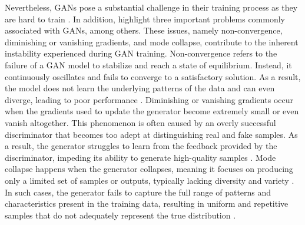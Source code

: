 Nevertheless, GANs pose a substantial challenge in their training process as they are hard to train \citep{goodfellowGAN}. In addition, \citeauthor{brophyGAN} highlight three important problems commonly associated with GANs, among others. These issues, namely non-convergence, diminishing or vanishing gradients, and mode collapse, contribute to the inherent instability experienced during GAN training. Non-convergence refers to the failure of a GAN model to stabilize and reach a state of equilibrium. Instead, it continuously oscillates and fails to converge to a satisfactory solution. As a result, the model does not learn the underlying patterns of the data and can even diverge, leading to poor performance \citep{brophyGAN}. Diminishing or vanishing gradients occur when the gradients used to update the generator become extremely small or even vanish altogether. This phenomenon is often caused by an overly successful discriminator that becomes too adept at distinguishing real and fake samples. As a result, the generator struggles to learn from the feedback provided by the discriminator, impeding its ability to generate high-quality samples \citep{brophyGAN}. Mode collapse happens when the generator collapses, meaning it focuses on producing only a limited set of samples or outputs, typically lacking diversity and variety \citep{salimansNIPS}. In such cases, the generator fails to capture the full range of patterns and characteristics present in the training data, resulting in uniform and repetitive samples that do not adequately represent the true distribution \citep{brophyGAN}.